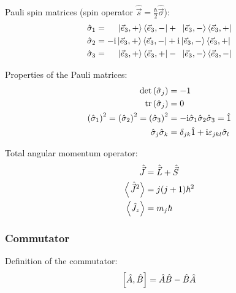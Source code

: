 		\noindent
		Pauli spin matrices (spin operator $\hat{\vec{s}} = \frac{\hbar}{2} \hat{\vec{\sigma}}$):
		\begin{equation}
			\begin{aligned}
				\hat{\sigma}_1 &= \phantom{-i}\Ket{\vec{e}_3,+} \Bra{\vec{e}_3,-} + \phantom{i}\Ket{\vec{e}_3,-} \Bra{\vec{e}_3,+} \\
				\hat{\sigma}_2 &= -\mathrm{i}\Ket{\vec{e}_3,+} \Bra{\vec{e}_3,-} + \mathrm{i}\Ket{\vec{e}_3,-} \Bra{\vec{e}_3,+} \\
				\hat{\sigma}_3 &= \phantom{-i}\Ket{\vec{e}_3,+} \Bra{\vec{e}_3,+} - \phantom{i}\Ket{\vec{e}_3,-} \Bra{\vec{e}_3,-} \\
			\end{aligned}
		\end{equation}

		\noindent
		Properties of the Pauli matrices:
		\begin{equation}
			\begin{aligned}
				\det\left( \hat{\sigma}_j \right) &= -1 \\
				\mathrm{tr}\left( \hat{\sigma}_j \right) &= 0 \\
				\left( \hat{\sigma}_1 \right)^2 = \left( \hat{\sigma}_2 \right)^2 = \left( \hat{\sigma}_3 \right)^2 &= -\mathrm{i}\hat{\sigma}_1\hat{\sigma}_2\hat{\sigma}_3 = \hat{1} \\
				\hat{\sigma}_j \hat{\sigma}_k &= \delta_{jk}\hat{1} + \mathrm{i}\varepsilon_{jkl}\hat{\sigma}_l
			\end{aligned}
		\end{equation}

		\noindent
		Total angular momentum operator:
		\begin{equation}
			\begin{aligned}
				\hat{\vec{J}} &= \hat{\vec{L}} + \hat{\vec{S}} \\
				\left< \hat{\pvec{J}}^2 \right> &= j(j+1)\hbar^2 \\
				\left< \hat{J}_z \right> &= m_j\hbar \\
			\end{aligned}
		\end{equation}

		\subsubsection{Commutator}
			\noindent
			Definition of the commutator:
			\begin{equation}
				\left[\hat{A},\hat{B}\right] = \hat{A}\hat{B} - \hat{B}\hat{A}
			\end{equation}

